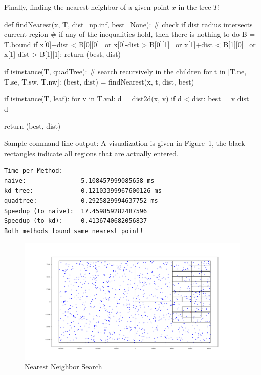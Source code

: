 \documentclass[english, fontsize=12pt, paper=a4, twoside=false, draft=true, pagesize=auto, version=last, DIV=16]{scrartcl}
\theoremstyle{break}
\begin{document}
Finally, finding the nearest neighbor of a given point $x$ in the tree $T$:

\begin{python}
def findNearest(x, T, dist=np.inf, best=None):
    # check if dist radius intersects current region
    # if any of the inequalities hold, then there is nothing to do
    B = T.bound
    if x[0]+dist < B[0][0] \
            or x[0]-dist > B[0][1] \
            or x[1]+dist < B[1][0] \
            or x[1]-dist > B[1][1]:
                return (best, dist)

    if isinstance(T, quadTree):
        # search recursively in the children
        for t in [T.ne, T.se, T.sw, T.nw]:
            (best, dist) = findNearest(x, t, dist, best)

    if isinstance(T, leaf):
        for v in T.val:
            d = dist2d(x, v)
            if d < dist:
                best = v
                dist = d

    return (best, dist)
\end{python}

Sample command line output: A visualization is given in Figure~\ref{fig:q}, the black rectangles indicate all regions that are actually entered.

\begin{verbatim}
Time per Method:
naive:               5.108457999085658 ms
kd-tree:             0.12103399967600126 ms
quadtree:            0.2925829994637752 ms
Speedup (to naive):  17.459859282487596
Speedup (to kd):     0.4136740682056837
Both methods found same nearest point!
\end{verbatim}

\begin{figure}[tbhp]
  \centering
  \includegraphics[width=0.99\textwidth]{./images/quadtrav.png}
  \caption{Nearest Neighbor Search}
  \label{fig:q}
\end{figure}
\end{document}

